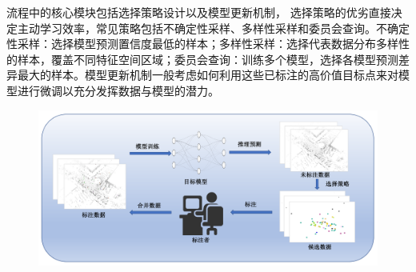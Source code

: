 流程中的核心模块包括选择策略设计以及模型更新机制，%
选择策略的优劣直接决定主动学习效率，常见策略包括不确定性采样、多样性采样和委员会查询。不确定性采样：选择模型预测置信度最低的样本；多样性采样：选择代表数据分布多样性的样本，覆盖不同特征空间区域；委员会查询：训练多个模型，选择各模型预测差异最大的样本。模型更新机制一般考虑如何利用这些已标注的高价值目标点来对模型进行微调以充分发挥数据与模型的潜力。%
\vspace{-0.1cm}
\begin{figure}[h]
    \centering
    \includegraphics[width = \textwidth, scale=0.5]{ljx/figure/2-2AL.pdf}
    \label{fig:2-2}
\end{figure}
\vspace{-0.35cm}

